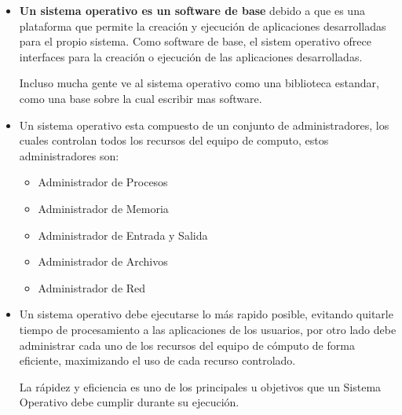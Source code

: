 \documentclass[12pt, fleqn]{report}                             %
\begin{document}
                \begin{itemize}
                    \item 
                        \textbf{Un sistema operativo es un software de base} debido a que es una plataforma
                        que permite la creación y ejecución de aplicaciones desarrolladas para el propio
                        sistema.
                        Como software de base, el sistem operativo ofrece interfaces para la creación o 
                        ejecución de las aplicaciones desarrolladas.

                        Incluso mucha gente ve al sistema operativo como una biblioteca estandar, como una
                        base sobre la cual escribir mas software.

                    \item
                        Un sistema operativo esta compuesto de un conjunto de administradores,
                        los cuales controlan todos los recursos del equipo de computo, estos
                        administradores son: 

                        \begin{itemize}
                            \item Administrador de Procesos
                            \item Administrador de Memoria 
                            \item Administrador de Entrada y Salida 
                            \item Administrador de Archivos 
                            \item Administrador de Red 
                        \end{itemize}

                    \item
                        Un sistema operativo debe ejecutarse lo más rapido posible, evitando quitarle
                        tiempo de procesamiento a las aplicaciones de los usuarios, por otro lado
                        debe administrar cada uno de los recursos del equipo de cómputo de forma
                        eficiente, maximizando el uso de cada recurso controlado.

                        La rápidez y eficiencia es uno de los principales u objetivos que un Sistema
                        Operativo debe cumplir durante su ejecución.
            
                \end{itemize}
       
\end{document}
